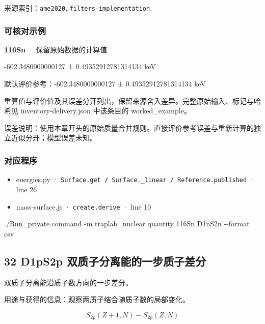 \documentclass[
  11pt,
  letterpaper,
]{article}
\newenvironment{Shaded}{}{}
\newcommand{\AttributeTok}[1]{\textcolor[rgb]{0.49,0.56,0.16}{#1}}
\newcommand{\ExtensionTok}[1]{#1}
\newcommand{\NormalTok}[1]{#1}
\providecommand{\tightlist}{%
  \setlength{\itemsep}{0pt}\setlength{\parskip}{0pt}}
\begin{document}
来源索引：\texttt{ame2020}, \texttt{filters-implementation}.

\subsubsection{可核对示例}\label{ux53efux6838ux5bf9ux793aux4f8b-30}

\textbf{116Sn} · 保留原始数据的计算值

-602.3480000000127 ± 0.49352912781314134 keV

默认评价参考：-602.3480000000127 ± 0.49352912781314134 keV

重算值与评价值及其误差分开列出，保留来源舍入差异。完整原始输入、标记与哈希见
inventory-delivery.json 中该条目的 worked\_example。

误差说明：使用本章开头的原始质量合并规则。直接评价参考误差与重新计算的独立近似分开；模型误差未知。

\subsubsection{对应程序}\label{ux5bf9ux5e94ux7a0bux5e8f-30}

\begin{itemize}
\tightlist
\item
  energies.py ·
  \texttt{Surface.get\ /\ Surface.\_linear\ /\ Reference.published} ·
  line 26
\item
  mass-surface.js · \texttt{create.derive} · line 10
\end{itemize}

\begin{Shaded}
\begin{Highlighting}[]
\ExtensionTok{./Run\_private.command} \AttributeTok{{-}m}\NormalTok{ traplab\_nuclear quantity 116Sn D1nS2n }\AttributeTok{{-}{-}format}\NormalTok{ csv}
\end{Highlighting}
\end{Shaded}

\subsection{32 D1pS2p
双质子分离能的一步质子差分}\label{d1ps2p-ux53ccux8d28ux5b50ux5206ux79bbux80fdux7684ux4e00ux6b65ux8d28ux5b50ux5deeux5206}

双质子分离能沿质子数方向的一步差分。

用途与获得的信息：观察两质子结合随质子数的局部变化。

\[
S_{2p}(Z+1,N)-S_{2p}(Z,N)
\]
\end{document}

